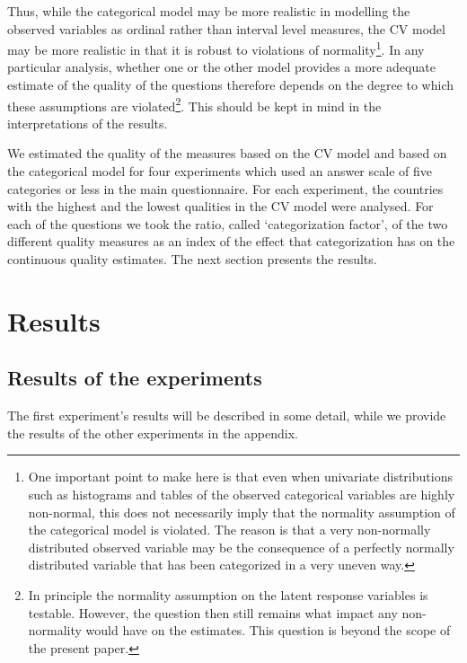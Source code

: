 \documentclass[a4paper,12pt]{article}
\begin{document}
Thus, while the categorical model may be more realistic in modelling the observed variables as ordinal rather than interval level measures, the CV model may be more realistic in that it is robust to violations of normality\footnote{One important point to make here is that even when univariate distributions such as histograms and tables of the observed categorical variables are highly non-normal, this does not necessarily imply that the normality assumption of the categorical model is violated. The reason is that a very non-normally distributed observed variable may be the consequence of a perfectly normally distributed variable that has been categorized in a very uneven way. }.
In any particular analysis, whether one or the other model provides a more adequate estimate of the quality of the questions therefore depends on the degree to which these assumptions are violated\footnote{In principle the normality assumption on the latent response variables is testable. However, the question then still remains what impact any non-normality would have on the estimates. This question is beyond the scope of the present paper.}. This should be kept in mind in the interpretations of the results.


We estimated the quality of the measures based on the CV model and based on the categorical model for four experiments which used an answer scale of five categories or less in the main questionnaire. For each experiment, the countries with the highest and the lowest qualities in the CV model were analysed.  For each of the questions we took the ratio, called `categorization factor', of the two different quality measures as an index of the effect that categorization has on the continuous quality estimates. The next section presents the results.


\section{Results}

\subsection{Results of the experiments}

The first experiment's results will be described in some detail, while we provide the results of the other experiments in the appendix.
\end{document}
